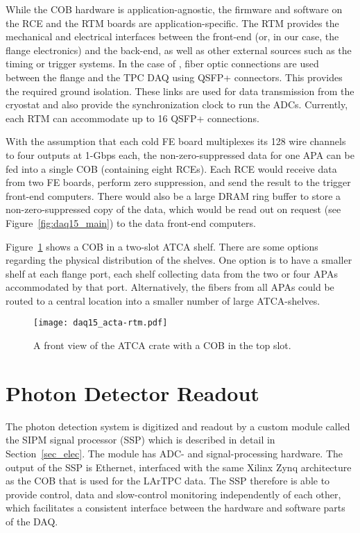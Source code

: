 While the COB hardware is application-agnostic, the firmware and
software on the RCE and the RTM boards are application-specific. The
RTM provides the mechanical and electrical interfaces between the
front-end (or, in our case, the flange electronics) and the back-end,
as well as other external sources such as the timing or trigger
systems.  In the case of \LBNE,
fiber optic connections are used between
the flange and the TPC DAQ using QSFP+ connectors. This provides the required ground isolation.  These links are used for data transmission from the cryostat and also provide the synchronization clock to run the ADCs.  Currently, each
RTM can accommodate up to 16 QSFP+ connections.

With 
the assumption that each cold FE board multiplexes its 128 wire
channels to four outputs at 1-Gbps each, the non-zero-suppressed data for
one APA can be fed into a single COB (containing eight RCEs).  Each RCE
would receive data from two FE boards, perform zero suppression, and
send the result to the trigger front-end computers.  There would also
be a large DRAM ring buffer to store a non-zero-suppressed copy of the
data, which would be read out on request (see
Figure~\ref{fig:daq15_main}) to the data front-end computers.

Figure~\ref{fig:daq15_atcapic} shows a COB in a two-slot ATCA shelf.
There are some options regarding the physical distribution of the
shelves.  One option is to have a smaller shelf at each flange port,
each shelf collecting data from the two or four APAs accommodated by that
port.  Alternatively, the fibers from all APAs could be routed to a
central location into a smaller number of large ATCA-shelves.

\begin{figure}[hbt]
  \texttt{[image: daq15\_acta-rtm.pdf]}
    \caption{\label{fig:daq15_atcapic}A front view of the ATCA crate with a COB in the top slot. }
\end{figure}

\section{Photon Detector Readout}
\label{sec:daq_ssp}

The photon detection system is digitized and readout by a custom
module called the SIPM signal processor (SSP) which is described in
detail in Section~\ref{sec_elec}.%
The module has ADC- and signal-processing hardware.  The output of the
SSP is Ethernet, interfaced with the same Xilinx Zynq architecture as
the COB that is used for the LArTPC data. The SSP therefore is able
to provide control, data and slow-control monitoring independently
of each other, which facilitates a consistent interface between the
hardware and software parts of the DAQ.

